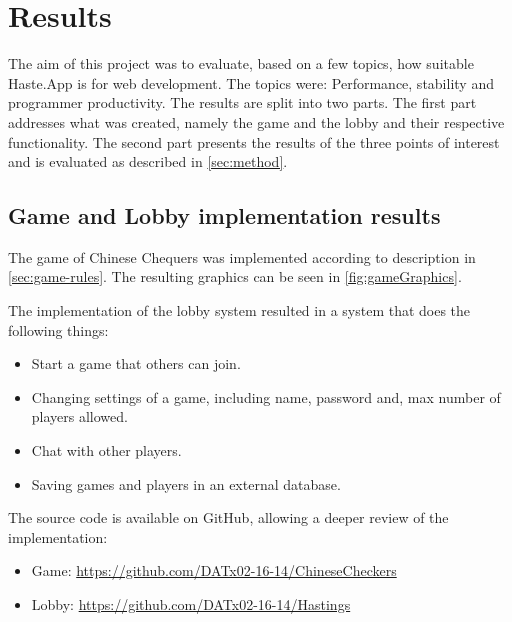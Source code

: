\documentclass[a4paper]{article}
\begin{document}
\newpage
\section{Results}
The aim of this project was to evaluate, based on a few topics, how suitable Haste.App is for web development. The topics were: Performance, stability and programmer productivity. The results are split into two parts. The first part addresses what was created, namely the game and the lobby and their respective functionality. The second part presents the results of the three points of interest and is evaluated as described in \cref{sec:method}.

\subsection{Game and Lobby implementation results}
\label{sub:game-lobby-results}
The game of Chinese Chequers was implemented according to description in \cref{sec:game-rules}. The resulting graphics can be seen in \cref{fig:gameGraphics}.


The implementation of the lobby system resulted in a system that does the following things:
\begin{itemize}[noitemsep]
    \item Start a game that others can join.
    \item Changing settings of a game, including name, password and, max number of players allowed.
    \item Chat with other players.
    \item Saving games and players in an external database.\\
\end{itemize}


The source code is available on GitHub, allowing a deeper review of the implementation:
\begin{itemize}[noitemsep]
    \item Game: \url{https://github.com/DATx02-16-14/ChineseCheckers}
    \item Lobby: \url{https://github.com/DATx02-16-14/Hastings}
\end{itemize}
\end{document}
